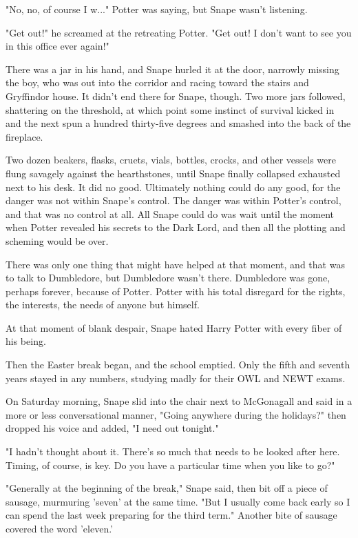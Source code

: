 \documentclass[a4paper,11pt]{article}
\begin{document}
"No, no, of course I w..." Potter was saying, but Snape wasn't listening.

"Get out!" he screamed at the retreating Potter. "Get out! I don't want to see you in this office ever again!"

There was a jar in his hand, and Snape hurled it at the door, narrowly missing the boy, who was out into the corridor and racing toward the stairs and Gryffindor house. It didn't end there for Snape, though. Two more jars followed, shattering on the threshold, at which point some instinct of survival kicked in and the next spun a hundred thirty-five degrees and smashed into the back of the fireplace.

Two dozen beakers, flasks, cruets, vials, bottles, crocks, and other vessels were flung savagely against the hearthstones, until Snape finally collapsed exhausted next to his desk. It did no good. Ultimately nothing could do any good, for the danger was not within Snape's control. The danger was within Potter's control, and that was no control at all. All Snape could do was wait until the moment when Potter revealed his secrets to the Dark Lord, and then all the plotting and scheming would be over.

There was only one thing that might have helped at that moment, and that was to talk to Dumbledore, but Dumbledore wasn't there. Dumbledore was gone, perhaps forever, because of Potter. Potter with his total disregard for the rights, the interests, the needs of anyone but himself.

At that moment of blank despair, Snape hated Harry Potter with every fiber of his being.

Then the Easter break began, and the school emptied. Only the fifth and seventh years stayed in any numbers, studying madly for their OWL and NEWT exams.

On Saturday morning, Snape slid into the chair next to McGonagall and said in a more or less conversational manner, "Going anywhere during the holidays?" then dropped his voice and added, "I need out tonight."

"I hadn't thought about it. There's so much that needs to be looked after here. Timing, of course, is key. Do you have a particular time when you like to go?"

"Generally at the beginning of the break," Snape said, then bit off a piece of sausage, murmuring 'seven' at the same time. "But I usually come back early so I can spend the last week preparing for the third term." Another bite of sausage covered the word 'eleven.'
\end{document}
